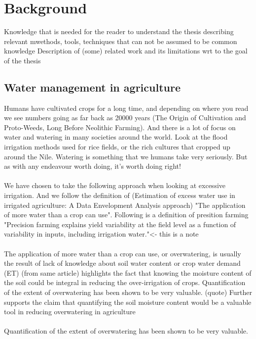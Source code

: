 \documentclass[]{uiophd}
\begin{document}
\chapter{Background}

Knowledge that is needed for the reader to understand the thesis describing relevant mwethods, tools, techniques that can not be assumed to be common knowledge
Description of (some) related work and its limitations wrt to the goal of the thesis

\section{Water management in agriculture}
Humans have cultivated crops for a long time, and depending on where you read we see numbers going as far back as 20000 years (The Origin of Cultivation and Proto-Weeds, Long Before Neolithic Farming). And there is a lot of focus on water and watering in many societies around the world. Look at the flood irrigation methods used for rice fields, or the rich cultures that cropped up around the Nile. Watering is something that we humans take very seriously. But as with any endeavour worth doing, it's worth doing right! 
\\\\
We have chosen to take the following approach when looking at excessive irrigation. And we follow the definition of (Estimation of excess water use in irrigated agriculture: A Data Envelopment Analysis approach) "The application of more water than a crop can use". Following is a definition of presition farming "Precision farming explains yield variability at the field level as a function of variability in inputs, including irrigation water."<- this is a note
\\\\

The application of more water than a crop can use, or overwatering, is usually the result of lack of knowledge about soil water content or crop water demand (ET) (from same article) highlights the fact that knowing the moisture content of the soil could be integral in reducing the over-irrigation of crops. Quantification of the extent of overwatering has been shown to be very valuable. (quote) Further supports the claim that quantifying the soil moisture content would be a valuable tool in reducing overwatering in agriculture
\\\\
Quantification of the extent of overwatering has been shown to be very valuable.
\end{document}
